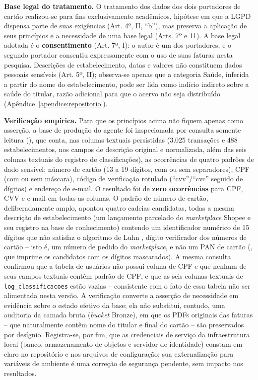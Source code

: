 \textbf{Base legal do tratamento.} O tratamento dos dados dos dois portadores de cartão realizou-se para fins exclusivamente acadêmicos, hipótese em que a LGPD dispensa parte de suas exigências (Art. 4º, II, ``b''), mas preserva a aplicação de seus princípios e a necessidade de uma base legal (Arts. 7º e 11). A base legal adotada é o \textbf{consentimento} (Art. 7º, I): o autor é um dos portadores, e o segundo portador consentiu expressamente com o uso de suas faturas nesta pesquisa. Descrições de estabelecimento, datas e valores não constituem dados pessoais sensíveis (Art. 5º, II); observa-se apenas que a categoria Saúde, inferida a partir do nome do estabelecimento, pode ser lida como indício indireto sobre a saúde do titular, razão adicional para que o acervo não seja distribuído (Apêndice~\ref{apendice:repositorio}).

\textbf{Verificação empírica.} Para que os princípios acima não fiquem apenas como asserção, a base de produção do agente foi inspecionada por consulta somente leitura (), que conta, nas colunas textuais persistidas (3.025 transações e 488 estabelecimentos, nos campos de descrição original e normalizada, além das seis colunas textuais do registro de classificações), as ocorrências de quatro padrões de dado sensível: número de cartão (13 a 19 dígitos, com ou sem separadores), CPF (com ou sem máscara), código de verificação rotulado (``cvv''/``cvc'' seguido de dígitos) e endereço de e-mail. O resultado foi de \textbf{zero ocorrências} para CPF, CVV e e-mail em todas as colunas. O padrão de número de cartão, deliberadamente amplo, apontou quatro cadeias candidatas, todas a mesma descrição de estabelecimento (um lançamento parcelado do \textit{marketplace} Shopee e seu registro na base de conhecimento) contendo um identificador numérico de 15 dígitos que não satisfaz o algoritmo de Luhn \cite{luhn1960patent}, dígito verificador dos números de cartão -- isto é, um número de pedido do \textit{marketplace}, e não um PAN de cartão (, que imprime os candidatos com os dígitos mascarados). A mesma consulta confirmou que a tabela de usuários não possui coluna de CPF e que nenhum de seus campos textuais contém padrão de CPF, e que as seis colunas textuais de \texttt{log\_classificacoes} estão vazias -- consistente com o fato de essa tabela não ser alimentada nesta versão. A verificação converte a asserção de necessidade em evidência sobre o estado efetivo da base; ela não substitui, contudo, uma auditoria da camada bruta (\textit{bucket} Bronze), em que os PDFs originais das faturas -- que naturalmente contêm nome do titular e final do cartão -- são preservados por desígnio. Registra-se, por fim, que as credenciais de serviço da infraestrutura local (banco, armazenamento de objetos e servidor de identidade) constam em claro no repositório e nos arquivos de configuração; sua externalização para variáveis de ambiente é uma correção de segurança pendente, sem impacto nos resultados.

